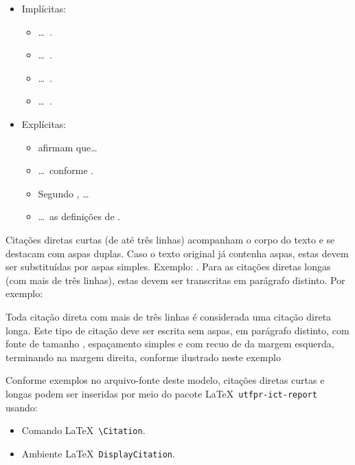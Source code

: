 \documentclass[%
  a4paper,%
  12pt,%
  fleqn,%
  english,%
  brazilian,%
]{article}
\begin{document}
\begin{itemize}
\item Implícitas:
\begin{itemize}
\item \ldots\ \cite{Ekenstein1997}.
\item \ldots\ \cite{Coleman1991,Nriagu1988}.
\item \ldots\ \cite{Wizentier1992,Faina2000,Larsson2020}.
\item \ldots\ \cite{Ekenstein1997,Nriagu1988,Faina2000}.
\end{itemize}
\item Explícitas:
\begin{itemize}
\item \textcite{Ekenstein1997} afirmam que\ldots%
\item \ldots\ conforme \textcite{Coleman1991,Nriagu1988}.
\item Segundo \textcite{Wizentier1992,Faina2000,Larsson2020}, \ldots%
\item \ldots\ as definições de \textcite{Ekenstein1997,Nriagu1988,Faina2000}.
\end{itemize}
\end{itemize}

Citações diretas curtas (de até três linhas) acompanham o corpo do texto e se destacam com aspas duplas.
Caso o texto original já contenha aspas, estas devem ser substituídas por aspas simples.
Exemplo: .
Para as citações diretas longas (com mais de três linhas), estas devem ser transcritas em parágrafo distinto.
Por exemplo:

\begin{DisplayCitation}[brazilian]{\cite[150]{Fulano2021}}
Toda citação direta com mais de três linhas é considerada uma citação direta longa.
Este tipo de citação deve ser escrita sem aspas, em parágrafo distinto, com fonte de tamanho , espaçamento simples e com recuo de  da margem esquerda, terminando na margem direita, conforme ilustrado neste exemplo
\end{DisplayCitation}

Conforme exemplos no arquivo-fonte deste modelo, citações diretas curtas e longas podem ser inseridas por meio do pacote \LaTeX\ \texttt{utfpr-ict-report} usando:

\begin{itemize}
\item Comando \LaTeX\ \verb|\Citation|.
\item Ambiente \LaTeX\ \texttt{DisplayCitation}.
\end{itemize}
\end{document}
